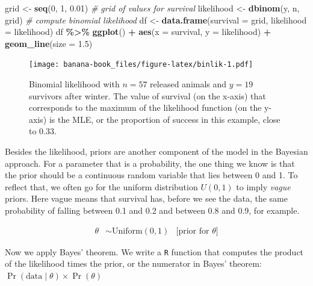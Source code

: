 \documentclass[
  12pt,
]{krantz}
\newenvironment{Shaded}{\begin{snugshade}}{\end{snugshade}}
\newcommand{\AttributeTok}[1]{\textcolor[rgb]{0.13,0.29,0.53}{#1}}
\newcommand{\CommentTok}[1]{\textcolor[rgb]{0.56,0.35,0.01}{\textit{#1}}}
\newcommand{\DecValTok}[1]{\textcolor[rgb]{0.00,0.00,0.81}{#1}}
\newcommand{\FloatTok}[1]{\textcolor[rgb]{0.00,0.00,0.81}{#1}}
\newcommand{\FunctionTok}[1]{\textcolor[rgb]{0.13,0.29,0.53}{\textbf{#1}}}
\newcommand{\NormalTok}[1]{#1}
\newcommand{\OtherTok}[1]{\textcolor[rgb]{0.56,0.35,0.01}{#1}}
\newcommand{\SpecialCharTok}[1]{\textcolor[rgb]{0.81,0.36,0.00}{\textbf{#1}}}
\begin{document}
\begin{Shaded}
\begin{Highlighting}[]
\NormalTok{grid }\OtherTok{\textless{}{-}} \FunctionTok{seq}\NormalTok{(}\DecValTok{0}\NormalTok{, }\DecValTok{1}\NormalTok{, }\FloatTok{0.01}\NormalTok{) }\CommentTok{\# grid of values for survival}
\NormalTok{likelihood }\OtherTok{\textless{}{-}} \FunctionTok{dbinom}\NormalTok{(y, n, grid) }\CommentTok{\# compute binomial likelihood}
\NormalTok{df }\OtherTok{\textless{}{-}} \FunctionTok{data.frame}\NormalTok{(}\AttributeTok{survival =}\NormalTok{ grid, }\AttributeTok{likelihood =}\NormalTok{ likelihood) }
\NormalTok{df }\SpecialCharTok{\%\textgreater{}\%}
  \FunctionTok{ggplot}\NormalTok{() }\SpecialCharTok{+} 
  \FunctionTok{aes}\NormalTok{(}\AttributeTok{x =}\NormalTok{ survival, }\AttributeTok{y =}\NormalTok{ likelihood) }\SpecialCharTok{+} 
  \FunctionTok{geom\_line}\NormalTok{(}\AttributeTok{size =} \FloatTok{1.5}\NormalTok{)}
\end{Highlighting}
\end{Shaded}

\begin{figure}
\centering
\texttt{[image: banana-book\_files/figure-latex/binlik-1.pdf]}
\caption{\label{fig:binlik}Binomial likelihood with \(n = 57\) released animals and \(y = 19\) survivors after winter. The value of survival (on the x-axis) that corresponds to the maximum of the likelihood function (on the y-axis) is the MLE, or the proportion of success in this example, close to 0.33.}
\end{figure}

Besides the likelihood, priors are another component of the model in the Bayesian approach. For a parameter that is a probability, the one thing we know is that the prior should be a continuous random variable that lies between 0 and 1. To reflect that, we often go for the uniform distribution \(U(0,1)\) to imply \emph{vague} priors. Here vague means that survival has, before we see the data, the same probability of falling between 0.1 and 0.2 and between 0.8 and 0.9, for example.

\begin{align*}
\theta &\sim \text{Uniform}(0, 1) &\text{[prior for }\theta \text{]}
\end{align*}

Now we apply Bayes' theorem. We write a \texttt{R} function that computes the product of the likelihood times the prior, or the numerator in Bayes' theorem: \(\Pr(\text{data} \mid \theta) \times \Pr(\theta)\)
\end{document}
